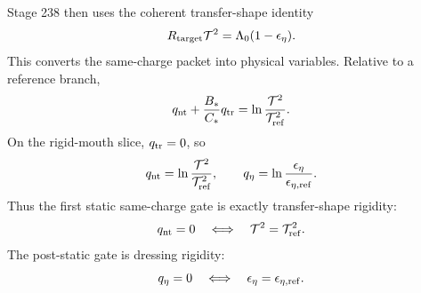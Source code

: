 Stage 238 then uses the coherent transfer-shape identity
\begin{equation}
\label{eq:part07-transfer-shape-identity}
R_{\rm target}\mathcal T^2=\Lambda_0(1-\epsilon_\eta).
\end{equation}
This converts the same-charge packet into physical variables.  Relative to a reference branch,
\begin{equation}
\label{eq:part07-qnt-transfer-shape}
q_{\rm nt}+\frac{B_*}{C_*}q_{\rm tr}
=
\ln\frac{\mathcal T^2}{\mathcal T_{\rm ref}^2}.
\end{equation}
On the rigid-mouth slice, \(q_{\rm tr}=0\), so
\begin{equation}
\label{eq:part07-rm-qnt-qeta-transfer}
q_{\rm nt}=\ln\frac{\mathcal T^2}{\mathcal T_{\rm ref}^2},
\qquad
q_\eta=\ln\frac{\epsilon_\eta}{\epsilon_{\eta,\rm ref}}.
\end{equation}
Thus the first static same-charge gate is exactly transfer-shape rigidity:
\begin{equation}
\label{eq:part07-transfer-shape-rigidity}
q_{\rm nt}=0
\quad\Longleftrightarrow\quad
\mathcal T^2=\mathcal T_{\rm ref}^2.
\end{equation}
The post-static gate is dressing rigidity:
\begin{equation}
\label{eq:part07-dressing-rigidity}
q_\eta=0
\quad\Longleftrightarrow\quad
\epsilon_\eta=\epsilon_{\eta,\rm ref}.
\end{equation}

